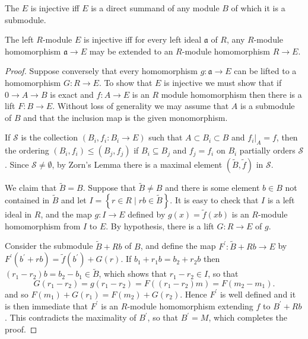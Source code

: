 \documentclass[12pt, oneside]{book}
\begin{document}
\begin{theorem}
    The $E$ is injective iff $E$ is a direct summand of any module $B$ of which it is a submodule.
\end{theorem}


\begin{theorem}
    \label{thm: Baer's Criterion}
    The left $R$-module $E$ is injective iff
    for every left ideal $\mathfrak{a}$ of $R$, any $R$-module homomorphism $\mathfrak{a} \rightarrow E$ may be extended to an $R$-module homomorphism $R \rightarrow E$.
    \begin{proof}
        Suppose conversely that every homomorphism $g: \mathfrak{a} \rightarrow E$ can be lifted to a homomorphism $G: R \rightarrow E$.
        To show that $E$ is injective we must show that if $0 \rightarrow A \rightarrow B$ is exact and $f: A \rightarrow E$ is an $R$ module homomorphism then there is a lift $F: B \rightarrow E$. Without loss of generality we may assume that $A$ is a submodule of $B$ and that the inclusion map is the given monomorphism.

        If $\mathcal{S}$ is the collection $\left(B_i,f_i:B_i \rightarrow E\right)$ such that
        $A\subset B_i\subset B$ and $\left.f_i\right|_{A}=f$, then the ordering $\left(B_i,f_i\right) \leq\left(B_j,f_j\right)$ if $B_i \subseteq B_j$ and $f_j= f_i$ on $B_i$ partially orders $\mathcal{S}$.
        Since $\mathcal{S} \neq \emptyset$, by Zorn's Lemma there is a maximal element $(\tilde{B},\tilde{f})$ in $\mathcal{S}.$

        We claim that $\tilde{B}=B$.
        Suppose that $\tilde{B}\neq B$ and there is some element $b \in B$ not contained in $\tilde{B}$ and let $I=\left\{r \in R \mid r b \in \tilde{B}\right\}$. It is easy to check that $I$ is a left ideal in $R$, and the map $g: I \rightarrow E$ defined by $g(x)=\tilde{f}(x b)$ is an $R$-module homomorphism from $I$ to $E$. By hypothesis, there is a lift $G: R \rightarrow E$ of $g$.

        Consider the submodule $\tilde{B}+R b$ of $B$, and define the map $F^{\prime}: \tilde{B}+R b \rightarrow E$ by $F^{\prime}\left(b^{\prime}+r b\right)=\tilde{f}\left(b^{\prime}\right)+G(r)$. If $b_1+r_1 b=b_2+r_2 b$ then $\left(r_1-r_2\right) b=b_2-b_1 \in \tilde{B}$, which
        shows that $r_1-r_2 \in I$, so that
        \begin{equation*}
            G\left(r_1-r_2\right)=g\left(r_1-r_2\right)=F\left(\left(r_1-r_2\right) m\right)=F\left(m_2-m_1\right) .
        \end{equation*}
        and so $F\left(m_1\right)+G\left(r_1\right)=F\left(m_2\right)+G\left(r_2\right)$. Hence $F^{\prime}$ is well defined and it is then immediate that $F^{\prime}$ is an $R$-module homomorphism extending $f$ to $B^{\prime}+R b$.
        This contradicts the maximality of $B^{\prime}$, so that $B^{\prime}=M$, which completes the proof.
    \end{proof}
\end{theorem}
\end{document}

